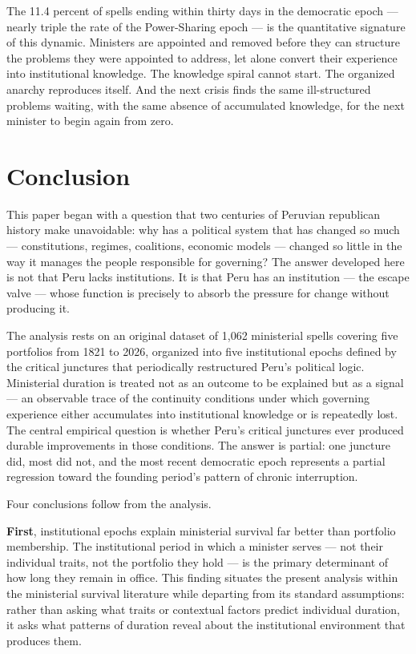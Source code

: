 \documentclass[doc, 12pt, a4paper,floatsintext]{apa7}
\begin{document}
The 11.4 percent of spells ending within thirty days in the 
democratic epoch --- nearly triple the rate of the Power-Sharing 
epoch --- is the quantitative signature of this dynamic. Ministers 
are appointed and removed before they can structure the problems 
they were appointed to address, let alone convert their experience 
into institutional knowledge. The knowledge spiral cannot start. 
The organized anarchy reproduces itself. And the next crisis finds 
the same ill-structured problems waiting, with the same absence 
of accumulated knowledge, for the next minister to begin again 
from zero.

\section{Conclusion}

This paper began with a question that two centuries of Peruvian 
republican history make unavoidable: why has a political system 
that has changed so much --- constitutions, regimes, coalitions, 
economic models --- changed so little in the way it manages the 
people responsible for governing? The answer developed here is 
not that Peru lacks institutions. It is that Peru has an 
institution --- the escape valve --- whose function is precisely 
to absorb the pressure for change without producing it.

The analysis rests on an original dataset of 1,062 ministerial 
spells covering five portfolios from 1821 to 2026, organized into 
five institutional epochs defined by the critical junctures that 
periodically restructured Peru's political logic. Ministerial 
duration is treated not as an outcome to be explained but as a 
signal --- an observable trace of the continuity conditions under 
which governing experience either accumulates into institutional 
knowledge or is repeatedly lost. The central empirical question 
is whether Peru's critical junctures ever produced durable 
improvements in those conditions. The answer is partial: one 
juncture did, most did not, and the most recent democratic epoch 
represents a partial regression toward the founding period's 
pattern of chronic interruption.

Four conclusions follow from the analysis.

\textbf{First}, institutional epochs explain ministerial survival 
far better than portfolio membership. The institutional period in 
which a minister serves --- not their individual traits, not the 
portfolio they hold --- is the primary determinant of how long 
they remain in office. This finding situates the present analysis 
within the ministerial survival literature while departing from 
its standard assumptions: rather than asking what traits or 
contextual factors predict individual duration, it asks what 
patterns of duration reveal about the institutional environment 
that produces them.
\end{document}
